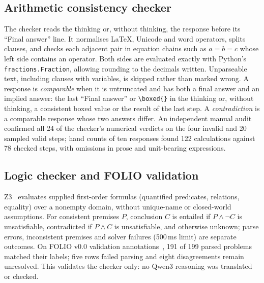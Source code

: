 \subsection{Arithmetic consistency checker}\label{sec:method-arith}
The checker reads the thinking or, without thinking, the response before its ``Final
answer'' line. It normalises LaTeX, Unicode and word operators, splits clauses, and
checks each adjacent pair in equation chains such as $a=b=c$ whose left side contains
an operator. Both sides are evaluated exactly with Python's
\texttt{fractions.Fraction}, allowing rounding to the decimals written. Unparseable
text, including clauses with variables, is skipped rather than marked wrong. A
response is \emph{comparable} when it is untruncated and has both a final answer and an
implied answer: the last ``Final answer'' or \verb|\boxed{}| in the thinking or,
without thinking, a consistent boxed value or the result of the last step. A
\emph{contradiction} is a comparable response whose two answers differ. An independent
manual audit confirmed all 24 of the checker's numerical verdicts on the four invalid
and 20 sampled valid steps; hand counts of ten responses found 122 calculations against
78 checked steps, with omissions in prose and unit-bearing expressions.

\subsection{Logic checker and FOLIO validation}\label{sec:method-logic}
Z3~\cite{demoura2008} evaluates supplied first-order formulas (quantified predicates,
relations, equality) over a nonempty domain, without unique-name or closed-world
assumptions. For consistent premises $P$, conclusion $C$ is entailed if $P\land\neg C$
is unsatisfiable, contradicted if $P\land C$ is unsatisfiable, and otherwise unknown;
parse errors, inconsistent premises and solver failures (500\,ms limit) are separate
outcomes. On FOLIO v0.0 validation annotations~\cite{han2024folio}, 191 of 199 parsed
problems matched their labels; five rows failed parsing and eight disagreements remain
unresolved. This validates the checker only: no Qwen3 reasoning was translated or
checked.

